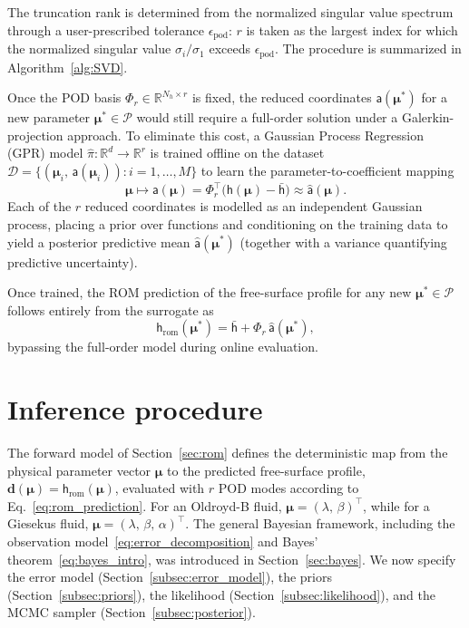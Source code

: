 \documentclass{elsarticle}
\renewcommand{\vec}[1]{\boldsymbol{#1}}
\newcommand{\mat}[1]{\mathsf{#1}}
\newcommand{\params}{\boldsymbol{\mu}}
\newcommand{\newparams}{\boldsymbol{\mu}^*}
\begin{document}
 The truncation rank is determined from the normalized singular value spectrum through a user-prescribed tolerance $\epsilon_{\mathrm{pod}}$: $r$ is taken as the largest index for which the normalized singular value $\sigma_i / \sigma_1$ exceeds $\epsilon_{\mathrm{pod}}$. The procedure is summarized in Algorithm~\ref{alg:SVD}.


Once the POD basis $\mat{\Phi}_r \in \mathbb{R}^{N_h \times r}$ is fixed, the
reduced coordinates $\mat{a}(\newparams)$ for a new parameter
$\newparams \in \mathcal{P}$ would still require a full-order solution under a
Galerkin-projection approach. To eliminate this cost, a Gaussian Process
Regression (GPR) model $\hat{\mat{\pi}} : \mathbb{R}^d \to \mathbb{R}^{r}$ is
trained offline on the dataset
$\mathcal{D} = \{(\params_i,\, \mat{a}(\params_i)) : i = 1, \dots, M\}$ to learn
the parameter-to-coefficient mapping
\begin{equation}
  \params \mapsto \mat{a}(\params)
  = \mat{\Phi}_r^\top \bigl(\mat{h}(\params) - \bar{\mat{h}}\bigr)
  \approx \hat{\mat{a}}(\params).
\end{equation}
Each of the $r$ reduced coordinates is modelled as an independent Gaussian
process, placing a prior over functions and conditioning on the training data to
yield a posterior predictive mean $\hat{\mat{a}}(\newparams)$ (together with a
variance quantifying predictive uncertainty).

Once trained, the ROM prediction of the free-surface profile for any new
$\newparams \in \mathcal{P}$ follows entirely from the surrogate as
\begin{equation}
  \mat{h}_{\mathrm{rom}}(\newparams)
  = \bar{\mat{h}}
  + \mat{\Phi}_r\,\hat{\mat{a}}(\newparams),
  \label{eq:rom_prediction}
\end{equation}
bypassing the full-order model during online evaluation.

\section{Inference procedure}
\label{sec:bayesian_inference}

The forward model of Section~\ref{sec:rom} defines the deterministic map from
the physical parameter vector $\params$ to the predicted free-surface profile,
$\vec{d}(\params) = \mat{h}_{\mathrm{rom}}(\params)$, evaluated with $r$ POD
modes according to Eq.~\eqref{eq:rom_prediction}. For an Oldroyd-B fluid,
$\params=(\lambda,\,\beta)^{\top}$, while for a Giesekus fluid,
$\params=(\lambda,\,\beta,\,\alpha)^{\top}$. The general Bayesian
framework, including the observation model~\eqref{eq:error_decomposition} and
Bayes' theorem~\eqref{eq:bayes_intro}, was introduced in
Section~\ref{sec:bayes}. We now specify the error model
(Section~\ref{subsec:error_model}), the priors (Section~\ref{subsec:priors}),
the likelihood (Section~\ref{subsec:likelihood}), and the MCMC sampler
(Section~\ref{subsec:posterior}).
\end{document}
